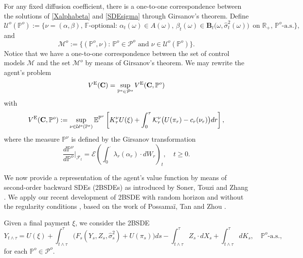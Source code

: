 \documentclass[11pt,a4paper]{article}
\numberwithin{equation}{section}
\def\dbE{\mathbb{E}}
\def\dbF{\mathbb{F}}
\def\dbP{\mathbb{P}}
\def\dbR{\mathbb{R}}
\newcommand{\cE}{\mathcal{E}}
\newcommand{\cF}{\mathcal{F}}
\newcommand{\cK}{\mathcal{K}}
\newcommand{\cM}{\mathcal{M}}
\newcommand{\cP}{\mathcal{P}}
\newcommand{\cU}{\mathcal{U}}
\newcommand{\Cbf}{\mathbf{C}}
\theoremstyle{definition}
\begin{document}
For any fixed diffusion coefficient, there is a one-to-one correspondence between the solutions of \eqref{Xalphabeta} and \eqref{SDEsigma} through Girsanov's theorem. 
Define 
  $$ \cU^o(\dbP^o):=\big\{\nu=(\alpha,\beta), \,\dbF\mbox{-optional: } \alpha_t(\omega)\in A(\omega),\,\beta_t(\omega)\in \mathbf{B}_t\big(\omega,\widehat{\sigma}_t^2(\omega)\big)\,\mbox{ on }\dbR_+, \,\dbP^o\mbox{-a.s.}\big\}, $$
  and 
  $$ \cM^o:=\big\{(\dbP^o,\nu):\,\dbP^o\in\cP^o \mbox{ and } \nu\in \cU^o(\dbP^o)\big\}. $$
Notice that we have a one-to-one correspondence between the set of control models $\cM$ and the set $\cM^o$ by means of Girsanov's theorem. 
We may rewrite the agent's problem 
 \begin{equation*}
   V^{\rm E}(\Cbf) = \sup_{\dbP^o\in\cP^o}V^{\rm E}(\Cbf,\dbP^o)
 \end{equation*}
 with 
 \begin{equation*}
   V^{\rm E}(\Cbf,\dbP^o) := \sup_{\nu\in\cU^o(\dbP^o)}\dbE^{\dbP^{\nu}}\left[K_\tau^\nu U(\xi) + \int_0^\tau\cK_r^\nu\big(U(\pi_r)-c_r(\nu_r)\big)dr\right],
 \end{equation*}
  where the measure $\dbP^\nu$ is defined by the Girsanov transformation 
   $$ \frac{d\dbP^\nu}{d\dbP^o}\Big|_{\cF_t} = \cE\left(\int_0^\cdot\lambda_r(\alpha_r)\cdot dW_r\right)_t, \quad t\geq 0. $$
 
\vspace{3mm}
 
We now provide a representation of the agent's value function by means of second-order backward SDEs (2BSDEs) as introduced by Soner, Touzi and Zhang \cite{STZ12}. 
We apply our recent development of 2BSDE with random horizon and without the regularity conditions \cite{LRTY18}, based on the work of Possama\"i, Tan and Zhou \cite{PTZ18}.

Given a final payment $\xi$, we consider the 2BSDE
 \begin{equation} \label{2BSDE}
   Y_{t\wedge\tau} = U(\xi) + \int_{t\wedge\tau}^\tau \big(F_s(Y_s,Z_s,\widehat{\sigma}^2_s) + U(\pi_s)\big)ds - \int_{t\wedge\tau}^\tau Z_s\cdot dX_s + \int_{t\wedge\tau}^\tau dK_s, \quad \dbP^o\mbox{-a.s.}, 
 \end{equation}
 for each $\dbP^o\in\cP^o$. 
\end{document}
